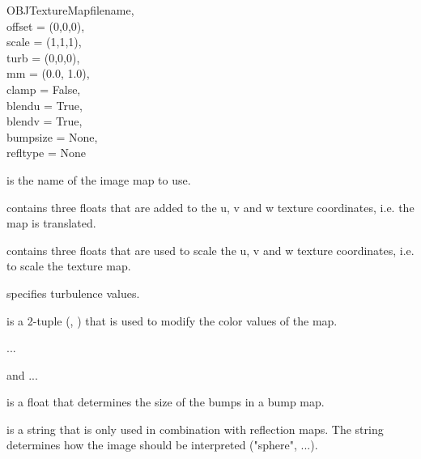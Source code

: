 \begin{classdesc}{OBJTextureMap}{filename,\\
                                 offset = (0,0,0),\\
                                 scale = (1,1,1),\\
                                 turb = (0,0,0),\\
                                 mm = (0.0, 1.0),\\
                                 clamp = False,\\
                                 blendu = True,\\
                                 blendv = True,\\
                                 bumpsize = None,\\
                                 refltype = None
                                }

 is the name of the image map to use.

 contains three floats that are added to the u, v and w texture
coordinates, i.e. the map is translated.

 contains three floats that are used to scale the u, v and w 
texture coordinates, i.e. to scale the texture map.

 specifies turbulence values.

 is a 2-tuple (, ) that is used to modify the
color values of the map.

...

 and ...

 is a float that determines the size of the bumps in a bump map.

 is a string that is only used in combination with reflection
maps. The string determines how the image should be interpreted 
("sphere", ...).

\end{classdesc}

